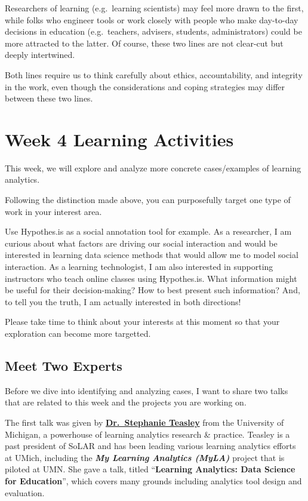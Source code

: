 \documentclass[
]{book}
\begin{document}
Researchers of learning (e.g.~learning scientists) may feel more drawn to the first, while folks who engineer tools or work closely with people who make day-to-day decisions in education (e.g.~teachers, advisers, students, administrators) could be more attracted to the latter. Of course, these two lines are not clear-cut but deeply intertwined.

Both lines require us to think carefully about ethics, accountability, and integrity in the work, even though the considerations and coping strategies may differ between these two lines.

\hypertarget{week-4-learning-activities}{%
\section{Week 4 Learning Activities}\label{week-4-learning-activities}}

This week, we will explore and analyze more concrete cases/examples of learning analytics.

Following the distinction made above, you can purposefully target one type of work in your interest area.

Use Hypothes.is as a social annotation tool for example. As a researcher, I am curious about what factors are driving our social interaction and would be interested in learning data science methods that would allow me to model social interaction. As a learning technologist, I am also interested in supporting instructors who teach online classes using Hypothes.is. What information might be useful for their decision-making? How to best present such information? And, to tell you the truth, I am actually interested in both directions!

Please take time to think about your interests at this moment so that your exploration can become more targetted.

\hypertarget{meet-two-experts}{%
\subsection{Meet Two Experts}\label{meet-two-experts}}

Before we dive into identifying and analyzing cases, I want to share two talks that are related to this week and the projects you are working on.

The first talk was given by \textbf{\href{https://www.si.umich.edu/people/stephanie-teasley}{Dr.~Stephanie Teasley}} from the University of Michigan, a powerhouse of learning analytics research \& practice. Teasley is a past president of SoLAR and has been leading various learning analytics efforts at UMich, including the \textbf{\emph{My Learning Analytics (MyLA)}} project that is piloted at UMN. She gave a talk, titled ``\textbf{Learning Analytics: Data Science for Education}'', which covers many grounds including analytics tool design and evaluation.
\end{document}
